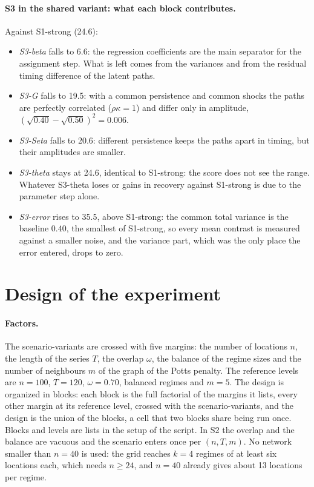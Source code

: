 \documentclass[11pt]{article}
\begin{document}
\paragraph{S3 in the shared variant: what each block contributes.} Against S1-strong (24.6):
\begin{itemize}[leftmargin=1.5em]
  \item \emph{S3-beta} falls to 6.6: the regression coefficients are the main separator for the assignment step. What is left comes from the variances and from the residual timing difference of the latent paths.
  \item \emph{S3-G} falls to 19.5: with a common persistence and common shocks the paths are perfectly correlated ($\rho\kappa = 1$) and differ only in amplitude, $(\sqrt{0.40} - \sqrt{0.50})^2 = 0.006$.
  \item \emph{S3-Seta} falls to 20.6: different persistence keeps the paths apart in timing, but their amplitudes are smaller.
  \item \emph{S3-theta} stays at 24.6, identical to S1-strong: the score does not see the range. Whatever S3-theta loses or gains in recovery against S1-strong is due to the parameter step alone.
  \item \emph{S3-error} rises to 35.5, above S1-strong: the common total variance is the baseline $0.40$, the smallest of S1-strong, so every mean contrast is measured against a smaller noise, and the variance part, which was the only place the error entered, drops to zero.
\end{itemize}

\section{Design of the experiment}\label{sec:design}

\paragraph{Factors.} The scenario-variants are crossed with five margins: the number of locations $n$, the length of the series $T$, the overlap $\omega$, the balance of the regime sizes and the number of neighbours $m$ of the graph of the Potts penalty. The reference levels are $n = 100$, $T = 120$, $\omega = 0.70$, balanced regimes and $m = 5$. The design is organized in blocks: each block is the full factorial of the margins it lists, every other margin at its reference level, crossed with the scenario-variants, and the design is the union of the blocks, a cell that two blocks share being run once. Blocks and levels are lists in the setup of the script. In S2 the overlap and the balance are vacuous and the scenario enters once per $(n, T, m)$. No network smaller than $n = 40$ is used: the grid reaches $k = 4$ regimes of at least six locations each, which needs $n \ge 24$, and $n = 40$ already gives about 13 locations per regime.
\end{document}
